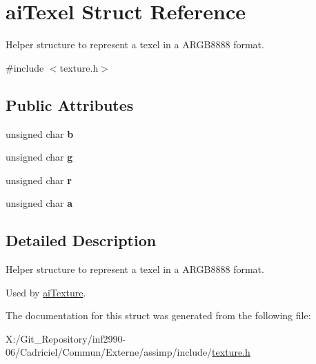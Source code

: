 \hypertarget{structai_texel}{\section{ai\-Texel Struct Reference}
\label{structai_texel}
}


Helper structure to represent a texel in a A\-R\-G\-B8888 format.  




{\ttfamily \#include $<$texture.\-h$>$}

\subsection*{Public Attributes}
\begin{DoxyCompactItemize}
\item 
\hypertarget{structai_texel_a5b4f97f69cf59cb9065af67389599ba6}{unsigned char {\bfseries b}}\label{structai_texel_a5b4f97f69cf59cb9065af67389599ba6}

\item 
\hypertarget{structai_texel_a41da3516b8241165e4ca58ea8ed68fe6}{unsigned char {\bfseries g}}\label{structai_texel_a41da3516b8241165e4ca58ea8ed68fe6}

\item 
\hypertarget{structai_texel_ae9408c0d18f6ff597715cc626398a0ff}{unsigned char {\bfseries r}}\label{structai_texel_ae9408c0d18f6ff597715cc626398a0ff}

\item 
\hypertarget{structai_texel_a6d4450e83b02b29d24f7aab27958034e}{unsigned char {\bfseries a}}\label{structai_texel_a6d4450e83b02b29d24f7aab27958034e}

\end{DoxyCompactItemize}


\subsection{Detailed Description}
Helper structure to represent a texel in a A\-R\-G\-B8888 format. 

Used by \hyperlink{structai_texture}{ai\-Texture}. 

The documentation for this struct was generated from the following file\-:\begin{DoxyCompactItemize}
\item 
X\-:/\-Git\-\_\-\-Repository/inf2990-\/06/\-Cadriciel/\-Commun/\-Externe/assimp/include/\hyperlink{texture_8h}{texture.\-h}\end{DoxyCompactItemize}
